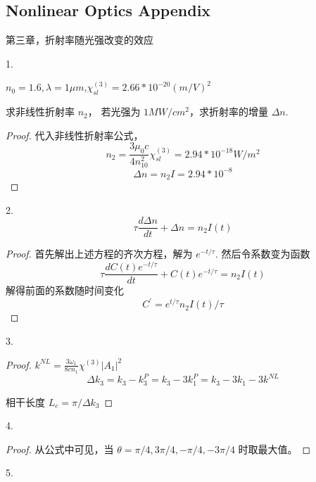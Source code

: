 \subsection{Nonlinear Optics Appendix}

第三章，折射率随光强改变的效应

\begin{exercise}

1. 

$n_0=1.6,\lambda = 1\mu m$,$ \chi_{sl}^{(3)}=2.66*10^{-20} (m/V)^2$

求非线性折射率 $n_2$， 若光强为 $1MW/cm^2$，求折射率的增量 $\Delta n$.

\end{exercise}

\begin{proof}
代入非线性折射率公式，
$$n_2=\frac{3\mu_0 c}{4n_{10}^{2}} \chi_{sl}^{(3)}=2.94*10^{-18} W/m^2 $$
$$\Delta n = n_2 I = 2.94*10^{-8} $$
\end{proof}

\begin{exercise}
2.
$$\tau \frac{d\Delta n}{dt}+\Delta n=n_2 I(t)$$    
\end{exercise}

\begin{proof}
首先解出上述方程的齐次方程，解为 $e^{-t/\tau}$.
然后令系数变为函数$$\tau \frac{d C(t)e^{-t/\tau}}{dt}+ C(t)e^{-t/\tau}=n_2I(t)$$
解得前面的系数随时间变化$$C^\prime=e^{t/\tau}n_2I(t)/\tau $$
\end{proof}


\begin{exercise}
3.
\end{exercise}

\begin{proof}
$k^{NL}=\frac{3\omega_1}{8cn_1} \chi^{(3)} |A_1|^2$
$$\Delta k_{3}= k_3-k_3^{P}=k_3-3k_1^P=k_3-3k_1-3k^{NL}$$

相干长度 $L_c=\pi / \Delta k_{3}$
\end{proof}

\begin{exercise}
4.
\end{exercise}

\begin{proof}
从公式中可见，当 $\theta = \pi/4, 3\pi/4, -\pi/4, -3\pi/4$ 时取最大值。
\end{proof}

\begin{exercise}
5. 
\end{exercise}

